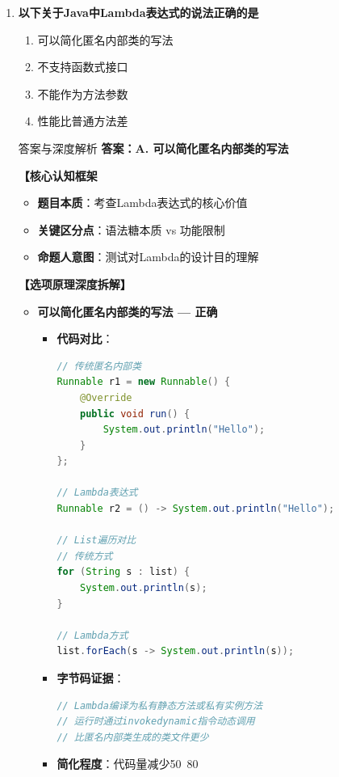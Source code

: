 \documentclass[12pt, a4paper]{ctexart}
\begin{document}
\begin{enumerate}[label=\textbf{\arabic*.}]
\begin{bluebox}{答案与深度解析}
		      \textbf{考场秒杀}：看到"判断集合是否为空"→选isEmpty()
	      \end{bluebox}

	      \vspace{1em}

	\item \textbf{以下关于Java中Lambda表达式的说法正确的是}
	      \begin{enumerate}[label=\Alph*.]
		      \item 可以简化匿名内部类的写法
		      \item 不支持函数式接口
		      \item 不能作为方法参数
		      \item 性能比普通方法差
	      \end{enumerate}

	      \begin{bluebox}{答案与深度解析}
		      \textbf{答案：A. 可以简化匿名内部类的写法}

		      \textbf{【核心认知框架}
		      \begin{itemize}[label={}, leftmargin=*, nosep]
			      \item \textbf{题目本质}：考查Lambda表达式的核心价值
			      \item \textbf{关键区分点}：语法糖本质 vs 功能限制
			      \item \textbf{命题人意图}：测试对Lambda的设计目的理解
		      \end{itemize}

		      \textbf{【选项原理深度拆解】}

		      \begin{itemize}[leftmargin=*, nosep, label={}]
			      \item[A] \textbf{可以简化匿名内部类的写法 — 正确}
			            \begin{itemize}[label={}, leftmargin=*, nosep]
				            \item \textbf{代码对比}：
				                  \begin{lstlisting}[language=Java]
// 传统匿名内部类
Runnable r1 = new Runnable() {
    @Override
    public void run() {
        System.out.println("Hello");
    }
};

// Lambda表达式
Runnable r2 = () -> System.out.println("Hello");

// List遍历对比
// 传统方式
for (String s : list) {
    System.out.println(s);
}

// Lambda方式
list.forEach(s -> System.out.println(s));
				      \end{lstlisting}
				            \item \textbf{字节码证据}：
				                  \begin{lstlisting}[language=Java]
// Lambda编译为私有静态方法或私有实例方法
// 运行时通过invokedynamic指令动态调用
// 比匿名内部类生成的类文件更少
				      \end{lstlisting}
				            \item \textbf{简化程度}：代码量减少50~80%
			            \end{itemize}


\end{itemize}
\end{bluebox}
\end{enumerate}
\end{document}
